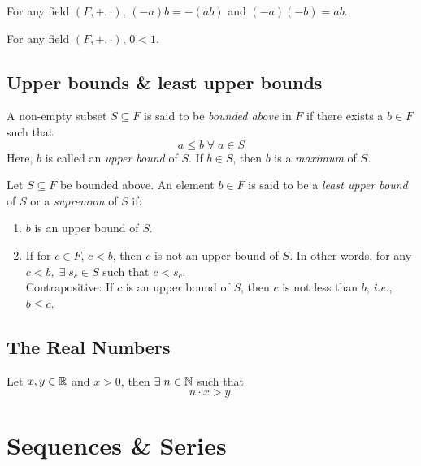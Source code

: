 \documentclass[12pt]{article}
\begin{document}
\begin{lem} \label{thm:field:(-a)b=-(ab)}
    For any field $(F, +, \cdot)$, $(-a)b = -(ab)$ and $(-a)(-b) = ab$.
\end{lem}

\begin{thm} \label{thm:field:0<1}
    For any field $(F, +, \cdot)$, $0 < 1$.
\end{thm}

\subsection{Upper bounds \& least upper bounds}

\begin{defn} \label{defn:upper_bound}
    A non-empty subset $S \subseteq F$ is said to be \emph{bounded above} in $F$ if there exists a $b \in F$ such that \[
        a \leq b \;\forall\; a \in S
    \]
    Here, $b$ is called an \emph{upper bound} of $S$. If $b \in S$, then $b$ is a \emph{maximum} of $S$.
\end{defn}

\begin{defn} \label{defn:upper_bound:supremum}
    Let $S \subseteq F$ be bounded above. An element $b \in F$ is said to be a \emph{least upper bound} of $S$ or a \emph{supremum} of $S$ if:
    \begin{enumerate}[label=(\alph*)]
        \item $b$ is an upper bound of $S$.
        \item If for $c \in F$, $c < b$, then $c$ is not an upper bound of $S$. In other words, for any $c < b, \;\exists\; s_{c} \in S$ such that $c < s_{c}$. \\
        Contrapositive: If $c$ is an upper bound of $S$, then $c$ is not less than $b$, \textit{i.e.}, $b \leq c$.
    \end{enumerate}
\end{defn}

\subsection{The Real Numbers}

\begin{thm} \label{thm:R:archimedean}
    Let $x, y \in \mathbb{R}$ and $x > 0$, then $\exists\; n \in \mathbb{N}$ such that \[
        n \cdot x > y.
    \]
\end{thm}

\section{Sequences \& Series}
\end{document}
